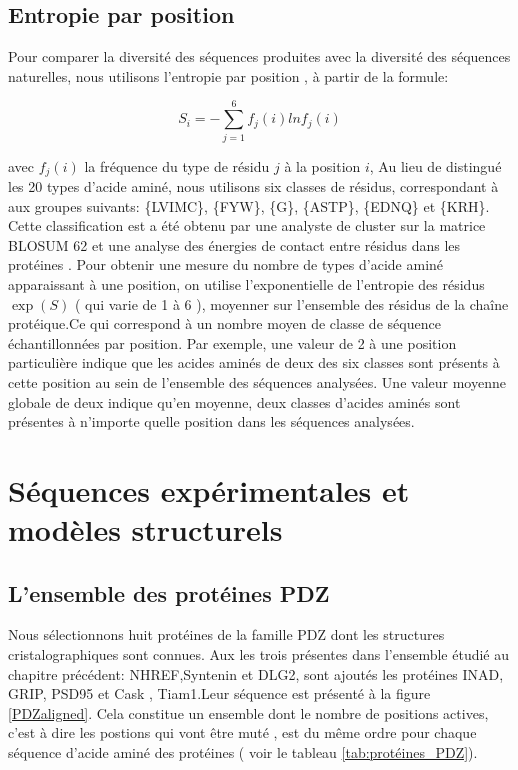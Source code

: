 \subsection{Entropie par position}
\label{subsection:Entropie}
Pour comparer la diversité des séquences produites avec la diversité des séquences naturelles, nous utilisons l'entropie par position \cite{DurbinBK}, à partir de la formule:

\begin{equation} \label{eq:entropy}
  S_i = - \sum_{j=1}^6 f_j(i)lnf_j(i)
\end{equation} 


avec $f_j(i)$ la fréquence du type de résidu $j$ à la position $i$, Au lieu de distingué les 20 types d'acide aminé, nous utilisons six classes de résidus, correspondant à  aux groupes suivants: \{LVIMC\}, \{FYW\}, \{G\}, \{ASTP\}, \{EDNQ\} et \{KRH\}. Cette classification est a été obtenu par une analyste de cluster  sur la matrice BLOSUM 62 \label{eq:entropy} et une analyse  des énergies de contact entre résidus dans les protéines \cite{Launay07} . Pour obtenir une mesure du nombre de types d'acide aminé apparaissant à une position, on utilise l'exponentielle de l'entropie des résidus $\exp(S)$ ( qui varie de 1 à 6 ), moyenner sur l'ensemble des résidus de la chaîne protéique.Ce qui correspond à un nombre moyen de classe de séquence échantillonnées par position. Par exemple, une valeur de 2 à une position particulière indique que les acides aminés de deux des six classes sont présents à cette position au sein de l'ensemble des séquences analysées. Une valeur moyenne globale de deux indique qu'en moyenne, deux classes d'acides aminés sont présentes à n'importe quelle position dans les séquences analysées.


\section{Séquences expérimentales et modèles structurels}
\subsection{L'ensemble des protéines PDZ}

Nous sélectionnons huit protéines de la famille PDZ dont les structures cristalographiques sont connues. Aux les trois présentes dans l'ensemble étudié au chapitre précédent:  NHREF,Syntenin et DLG2, sont ajoutés les protéines INAD, GRIP, PSD95 et Cask , Tiam1.Leur séquence est présenté à la figure \ref{PDZaligned}. Cela constitue un ensemble dont le nombre de positions actives, c'est à dire les postions qui vont être muté , est du même ordre pour chaque séquence d'acide aminé des protéines ( voir le tableau \ref{tab:protéines_PDZ}).


